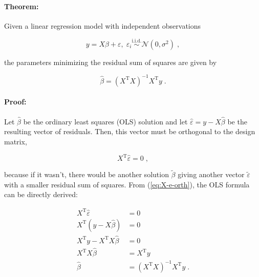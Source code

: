 

\setcounter{equation}{0}



\paragraph{Theorem:}

Given a linear regression model with independent observations

\begin{equation} \label{eq:MLR}
y = X\beta + \varepsilon, \; \varepsilon_i \overset{\mathrm{i.i.d.}}{\sim} \mathcal{N}(0, \sigma^2) \; ,
\end{equation}

the parameters minimizing the residual sum of squares are given by

\begin{equation} \label{eq:OLS}
\hat{\beta} = (X^\mathrm{T} X)^{-1} X^\mathrm{T} y \; .
\end{equation}


\paragraph{Proof:} Let $\hat{\beta}$ be the ordinary least squares (OLS) solution and let $\hat{\varepsilon} = y - X\hat{\beta}$ be the resulting vector of residuals. Then, this vector must be orthogonal to the design matrix,

\begin{equation} \label{eq:X-e-orth}
X^\mathrm{T} \hat{\varepsilon} = 0 \; ,
\end{equation}

because if it wasn't, there would be another solution $\tilde{\beta}$ giving another vector $\tilde{\varepsilon}$ with a smaller residual sum of squares. From (\ref{eq:X-e-orth}), the OLS formula can be directly derived:

\vspace{-0.5em}
\begin{equation} \label{eq:OLS-proof}
\begin{split}
X^\mathrm{T} \hat{\varepsilon} &= 0 \\
X^\mathrm{T} \left( y - X\hat{\beta} \right) &= 0 \\
X^\mathrm{T} y - X^\mathrm{T} X\hat{\beta} &= 0 \\
X^\mathrm{T} X\hat{\beta} &= X^\mathrm{T} y \\
\hat{\beta} &= (X^\mathrm{T} X)^{-1} X^\mathrm{T} y \; .
\end{split}
\end{equation}

